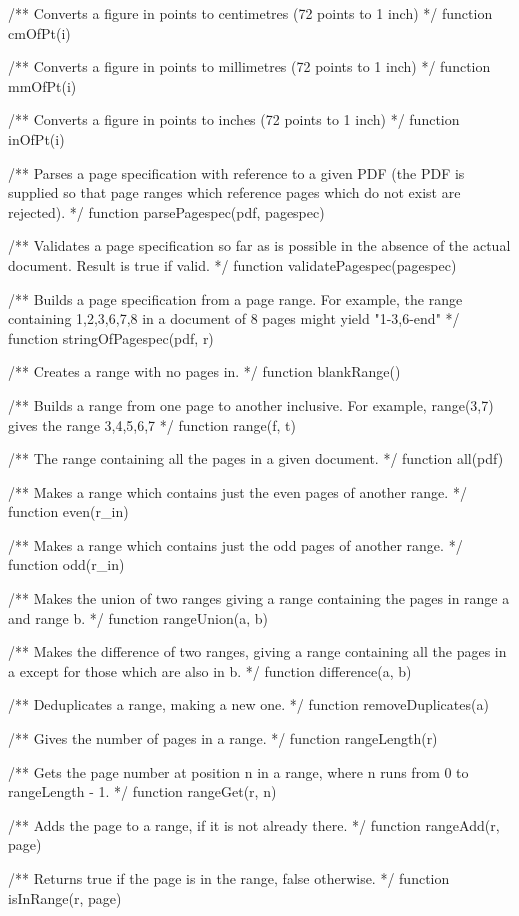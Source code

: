 /** Converts a figure in points to centimetres (72 points to 1 inch) */
function cmOfPt(i)

/** Converts a figure in points to millimetres (72 points to 1 inch) */
function mmOfPt(i)

/** Converts a figure in points to inches (72 points to 1 inch) */
function inOfPt(i)

/** Parses a page specification with reference to a given PDF (the PDF is
supplied so that page ranges which reference pages which do not exist are
rejected). */
function parsePagespec(pdf, pagespec)

/** Validates a page specification so far as is possible in the absence of
the actual document. Result is true if valid. */
function validatePagespec(pagespec)

/** Builds a page specification from a page range. For example, the range
containing 1,2,3,6,7,8 in a document of 8 pages might yield "1-3,6-end" */
function stringOfPagespec(pdf, r)

/** Creates a range with no pages in. */
function blankRange()

/** Builds a range from one page to another inclusive. For example, range(3,7)
gives the range 3,4,5,6,7 */
function range(f, t)

/** The range containing all the pages in a given document. */
function all(pdf)

/** Makes a range which contains just the even pages of another range. */
function even(r_in)

/** Makes a range which contains just the odd pages of another range. */
function odd(r_in)

/** Makes the union of two ranges giving a range containing the pages in range
a and range b. */
function rangeUnion(a, b)

/** Makes the difference of two ranges, giving a range containing all the
pages in a except for those which are also in b. */
function difference(a, b)

/** Deduplicates a range, making a new one. */
function removeDuplicates(a)

/** Gives the number of pages in a range. */
function rangeLength(r)

/** Gets the page number at position n in a range, where n runs from 0 to
rangeLength - 1. */
function rangeGet(r, n)

/** Adds the page to a range, if it is not already there. */
function rangeAdd(r, page)

/** Returns true if the page is in the range, false otherwise. */
function isInRange(r, page)

